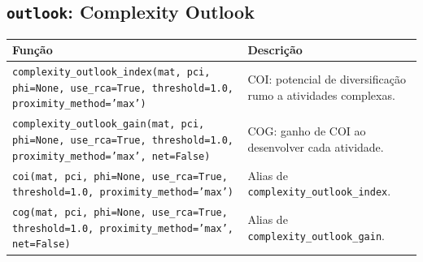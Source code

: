 \subsection{\texttt{outlook}: Complexity Outlook}
\begin{longtable}{>{\raggedright\arraybackslash}p{9.2cm} >{\raggedright\arraybackslash}p{7.0cm}}
\toprule
\textbf{Fun\c{c}\~{a}o} & \textbf{Descri\c{c}\~{a}o} \\
\midrule\endhead
\texttt{\footnotesize complexity\_outlook\_index(mat, pci, phi=None, use\_rca=True, threshold=1.0, proximity\_method='max')} & {\small COI: potencial de diversifica\c{c}\~{a}o rumo a atividades complexas.} \\[2pt]
\texttt{\footnotesize complexity\_outlook\_gain(mat, pci, phi=None, use\_rca=True, threshold=1.0, proximity\_method='max', net=False)} & {\small COG: ganho de COI ao desenvolver cada atividade.} \\[2pt]
\texttt{\footnotesize coi(mat, pci, phi=None, use\_rca=True, threshold=1.0, proximity\_method='max')} & {\small Alias de \texttt{complexity\_outlook\_index}.} \\[2pt]
\texttt{\footnotesize cog(mat, pci, phi=None, use\_rca=True, threshold=1.0, proximity\_method='max', net=False)} & {\small Alias de \texttt{complexity\_outlook\_gain}.} \\[2pt]
\bottomrule
\end{longtable}

